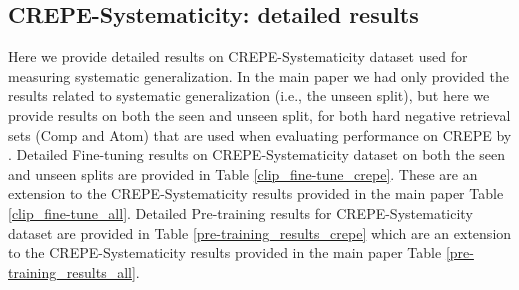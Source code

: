 \documentclass[11pt]{article}
\begin{document}
\subsection{CREPE-Systematicity: detailed results}
\label{crepe_detailed_results}
Here we provide detailed results on CREPE-Systematicity dataset used for measuring systematic generalization. In the main paper we had only provided the results related to systematic generalization (i.e., the unseen split), but here we provide results on both the seen and unseen split, for both hard negative retrieval sets (Comp and Atom) that are used when evaluating performance on CREPE by \citet{ma2022crepe}.
Detailed Fine-tuning results on CREPE-Systematicity dataset on both the seen and unseen splits are provided in Table \ref{clip_fine-tune_crepe}. These are an extension to the CREPE-Systematicity results provided in the main paper Table \ref{clip_fine-tune_all}. Detailed Pre-training results for CREPE-Systematicity dataset are provided in Table \ref{pre-training_results_crepe} which are an extension to the CREPE-Systematicity results provided in the main paper Table \ref{pre-training_results_all}. 
\end{document}

